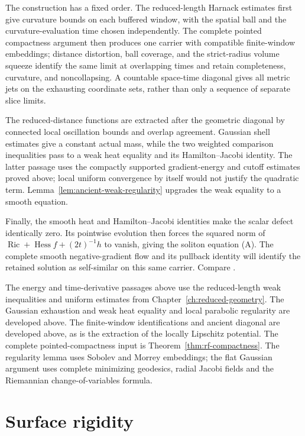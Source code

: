 The construction has a fixed order.  The
reduced-length Harnack estimates first give curvature bounds on each
buffered window, with the spatial ball and the curvature-evaluation time
chosen independently.  The complete pointed compactness argument then
produces one carrier with compatible finite-window embeddings; distance
distortion, ball coverage, and the strict-radius volume squeeze identify the
same limit at overlapping times and retain completeness, curvature, and
noncollapsing.  A countable space-time diagonal gives all metric jets on the
exhausting coordinate sets, rather than only a sequence of separate slice
limits.

The reduced-distance functions are extracted after the geometric diagonal by
connected local oscillation bounds and overlap agreement.  Gaussian shell
estimates give a constant actual mass, while the two weighted comparison
inequalities pass to a weak heat equality and its Hamilton--Jacobi identity.
The latter passage uses the compactly supported gradient-energy and cutoff
estimates proved above; local uniform convergence by itself would not
justify the quadratic term.  Lemma~\ref{lem:ancient-weak-regularity}
upgrades the weak equality to a smooth equation.

Finally, the smooth heat and Hamilton--Jacobi identities make the
scalar defect identically zero.  Its pointwise evolution then forces
the squared norm of
$\operatorname{Ric}+\operatorname{Hess}f+(2t)^{-1}h$ to vanish,
giving the soliton equation (A).  The complete smooth
negative-gradient flow and its pullback identity will identify
the retained solution as self-similar on this same carrier.
Compare \cite[Proposition 9.32 and Lemma 9.33,
pp.~200--202]{MT2007}.

\label{rem:ancient-energy-interface}
The energy and time-derivative passages above use the reduced-length
weak inequalities and uniform estimates from
Chapter~\ref{ch:reduced-geometry}.  The Gaussian exhaustion and weak
heat equality and local parabolic regularity are developed above.
The finite-window identifications and ancient diagonal are developed
above, as is the extraction of the locally Lipschitz potential.
The complete pointed-compactness input is
Theorem~\ref{thm:rf-compactness}.  The regularity lemma uses
Sobolev and Morrey embeddings; the flat Gaussian argument uses
complete minimizing geodesics, radial Jacobi fields and the
Riemannian change-of-variables formula.


\section{Surface rigidity}

